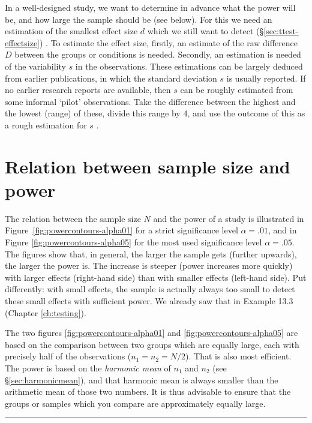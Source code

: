 \documentclass[
]{book}
\begin{document}
In a well-designed study, we want to determine in advance what
the power will be, and how large the sample should be (see below).
For this we need an estimation of the smallest effect size \(d\)
which we still want to detect
(§\ref{sec:ttest-effectsize}) \citep{Quene10}. To estimate the effect size, firstly,
an estimate of the raw difference \(D\) between the groups or conditions is needed.
Secondly, an estimation is needed of the variability \(s\)
in the observations. These estimations can be largely deduced from
earlier publications, in which the standard deviation
\(s\) is usually reported. If no earlier research reports are available,
then \(s\) can be roughly estimated from some informal
`pilot' observations. Take the difference between the highest and the lowest
(range) of these, divide this range by 4, and use the outcome of this as
a rough estimation for \(s\) \citep{PD08}.

\hypertarget{sec:samplesize-power}{%
\section{Relation between sample size and power}\label{sec:samplesize-power}}

The relation between the sample size \(N\) and the power of a study
is illustrated in
Figure~\ref{fig:powercontours-alpha01} for a strict significance
level \(\alpha=.01\), and in
Figure \ref{fig:powercontours-alpha05} for the most used
significance level \(\alpha=.05\). The figures show that, in general, the larger the
sample gets (further upwards), the larger the power is.
The increase is steeper (power increases more quickly) with larger
effects (right-hand side) than with smaller effects (left-hand side). Put differently:
with small effects, the sample is actually always too small to detect
these small effects with sufficient power. We already saw that in
Example 13.3 (Chapter \ref{ch:testing}).

The two figures \ref{fig:powercontours-alpha01} and
\ref{fig:powercontours-alpha05} are based on the comparison between two groups which are equally large, each with
precisely half of the observations (\(n_1=n_2=N/2\)). That is also most efficient.
The power is based on the \emph{harmonic mean} of \(n_1\) and \(n_2\) (see §\ref{sec:harmonicmean}), and
that harmonic mean is always smaller than the arithmetic mean of those two numbers. It is thus
advisable to ensure that the groups or samples which you compare are approximately equally large.

\begin{center}\rule{0.5\linewidth}{0.5pt}\end{center}
\end{document}
